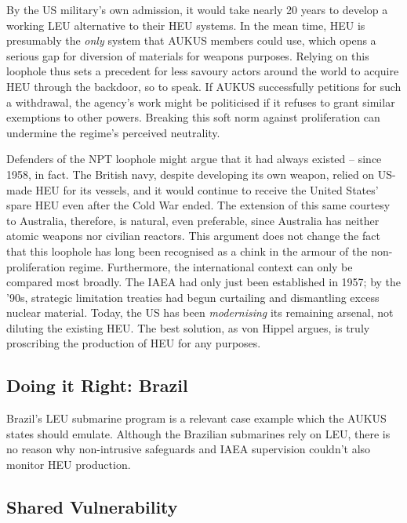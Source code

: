 \documentclass[letterpaper,12pt,twoside]{article} %
\begin{document}
\begin{multicols}{2}
By the US military's own admission, it would take nearly 20 years to develop a working LEU alternative to their HEU systems. In the mean time, HEU is presumably the \textit{only} system that AUKUS members could use, which opens a serious gap for diversion of materials for weapons purposes. Relying on this loophole thus sets a precedent for less savoury actors around the world to acquire HEU through the backdoor, so to speak. If AUKUS successfully petitions for such a withdrawal, the agency's work might be politicised if it refuses to grant similar exemptions to other powers. Breaking this soft norm against proliferation can undermine the regime's perceived neutrality.

Defenders of the NPT loophole might argue that it had always existed -- since 1958, in fact. The British navy, despite developing its own weapon, relied on US-made HEU for its vessels, and it would continue to receive the United States' spare HEU even after the Cold War ended.\autocite[39. Footnote 32.]{hippel2016banning} The extension of this same courtesy to Australia, therefore, is natural, even preferable, since Australia has neither atomic weapons nor civilian reactors. This argument does not change the fact that this loophole has long been recognised as a chink in the armour of the non-proliferation regime. Furthermore, the international context can only be compared most broadly. The IAEA had only just been established in 1957; by the '90s, strategic limitation treaties had begun curtailing and dismantling excess nuclear material. Today, the US has been \textit{modernising} its remaining arsenal, not diluting the existing HEU. The best solution, as von Hippel\autocite{hippel2016banning} argues, is truly proscribing the production of HEU for any purposes.

\subsection{Doing it Right: Brazil}

Brazil's LEU submarine program is a relevant case example which the AUKUS states should emulate. Although the Brazilian submarines rely on LEU, there is no reason why non-intrusive safeguards and IAEA supervision couldn't also monitor HEU production. 

\subsection{Shared Vulnerability}


\end{multicols}
\end{document}
